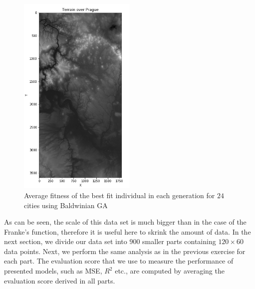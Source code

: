 \documentclass [11pt]{article}
\begin{document}
\begin{figure}[H]
\centering
\includegraphics[width=0.5\textwidth]{figures/TerrainPrague.png}
        \caption{Average fitness of the best fit individual in each generation for $24$ cities using Baldwinian GA}
        \label{fig:TerrainPrague}
\end{figure}
As can be seen, the scale of this data set is much bigger than in the case of the Franke's function, therefore it is useful here to skrink the amount of data. In the next section, we divide our data set into $900$ smaller parts containing $120 \times 60$ data points. Next, we perform the same analysis as in the previous exercise for each part. The evaluation score that we use to measure the performance of presented models, such as MSE, $R^{2}$ etc., are computed by averaging the evaluation score derived in all parts. \\
\end{document}
